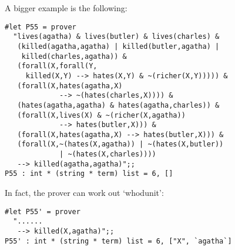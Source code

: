 \begin{slide*}


A bigger example is the following:

\begin{black}\begin{footnotesize}\begin{verbatim}
#let P55 = prover
  "lives(agatha) & lives(butler) & lives(charles) &
   (killed(agatha,agatha) | killed(butler,agatha) |
    killed(charles,agatha)) &
   (forall(X,forall(Y,
     killed(X,Y) --> hates(X,Y) & ~(richer(X,Y))))) &
   (forall(X,hates(agatha,X)
             --> ~(hates(charles,X)))) &
   (hates(agatha,agatha) & hates(agatha,charles)) &
   (forall(X,lives(X) & ~(richer(X,agatha))
             --> hates(butler,X))) &
   (forall(X,hates(agatha,X) --> hates(butler,X))) &
   (forall(X,~(hates(X,agatha)) | ~(hates(X,butler))
             | ~(hates(X,charles))))
   --> killed(agatha,agatha)";;
P55 : int * (string * term) list = 6, []
\end{verbatim}\end{footnotesize}\end{black}

In fact, the prover can work out `whodunit':

\begin{black}\begin{footnotesize}\begin{verbatim}
#let P55' = prover
  "......
   --> killed(X,agatha)";;
P55' : int * (string * term) list = 6, ["X", `agatha`]
\end{verbatim}\end{footnotesize}\end{black}

\end{slide*}







